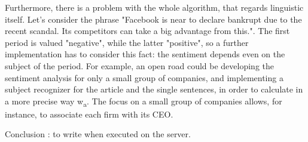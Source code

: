 Furthermore, there is a problem with the whole algorithm, that regards linguistic itself. Let's consider the phrase "Facebook is near to declare bankrupt due to the recent scandal. Its competitors can take a big advantage from this.". The first period is valued "negative", while the latter "positive", so a further implementation has to consider this fact: the sentiment depends even on the subject of the period. For example, an open road could be developing the sentiment analysis for only a small group of companies, and implementing a subject recognizer for the article and the single sentences, in order to calculate in a more precise way w\textsubscript{a}. The focus on a small group of companies allows, for instance, to associate each firm with its CEO.  
\par
Conclusion : to write when executed on the server.